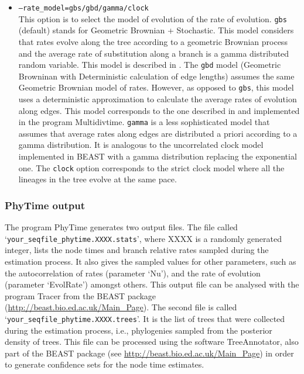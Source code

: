 \documentclass[a4paper,12pt]{article}
\newcommand{\x}[1]{\texttt{#1}}
\begin{document}
\begin{itemize}
\item \x{--rate\_model=gbs/gbd/gamma/clock}\index{command-line options!\x{--rate\_model}}\\
This option is to select the model of evolution of the rate of evolution. \x{gbs} (default) stands
for Geometric Brownian + Stochastic. This model considers that rates evolve along the tree
according to a geometric Brownian process \cite{kishino01} and the average rate of substitution
along a branch is a gamma distributed random variable. This model is described in \cite{guindon12}.
The \x{gbd} model (Geometric Browninan with Deterministic calculation of edge lengths) assumes the
same Geometric Brownian model of rates. However, as opposed to \x{gbs}, this model uses a
deterministic approximation to calculate the average rates of evolution along edges. This model
corresponds to the one described in \cite{kishino01} and implemented in the program Multidivtime.
\x{gamma} is a less sophisticated model that assumes that average rates along edges are distributed a
priori according to a gamma distribution. It is analogous to the uncorrelated clock model
implemented in BEAST with a gamma distribution replacing the exponential one. The \x{clock} option
corresponds to the strict clock model where all the lineages in the tree evolve at the same pace.
\end{itemize}

\subsubsection{PhyTime output}

The     program     PhyTime     generates     two     output     files.      The     file     called
`\x{your\_seqfile\_phytime.XXXX.stats}', where XXXX is a  randomly generated integer, lists the node
times and branch  relative rates sampled during  the estimation process.  It also  gives the sampled
values for other parameters, such as the  autocorrelation of rates (parameter `Nu'), and the rate of
evolution (parameter `EvolRate') amongst others.  This  output file can be analysed with the program
Tracer            from            the            BEAST            package
(\url{http://beast.bio.ed.ac.uk/Main_Page}).       The       second       file       is       called
`\x{your\_seqfile\_phytime.XXXX.trees}'.  It is the  list of  trees that  were collected  during the
estimation process, i.e., phylogenies sampled from the posterior density of trees.  This file can be
processed   using   the   software   TreeAnnotator,   also   part  of   the   BEAST   package   (see
\url{http://beast.bio.ed.ac.uk/Main_Page}) in  order to generate  confidence sets for the  node time
estimates.
\end{document}
